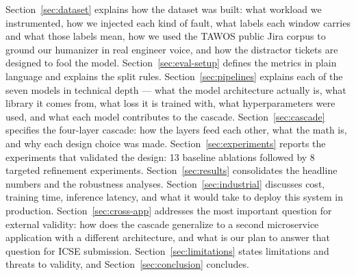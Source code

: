 Section~\ref{sec:dataset} explains how the dataset was built: what workload we instrumented, how we injected each kind of fault, what labels each window carries and what those labels mean, how we used the TAWOS public Jira corpus to ground our humanizer in real engineer voice, and how the distractor tickets are designed to fool the model. Section~\ref{sec:eval-setup} defines the metrics in plain language and explains the split rules. Section~\ref{sec:pipelines} explains each of the seven models in technical depth --- what the model architecture actually is, what library it comes from, what loss it is trained with, what hyperparameters were used, and what each model contributes to the cascade. Section~\ref{sec:cascade} specifies the four-layer cascade: how the layers feed each other, what the math is, and why each design choice was made. Section~\ref{sec:experiments} reports the experiments that validated the design: 13 baseline ablations followed by 8 targeted refinement experiments. Section~\ref{sec:results} consolidates the headline numbers and the robustness analyses. Section~\ref{sec:industrial} discusses cost, training time, inference latency, and what it would take to deploy this system in production. Section~\ref{sec:cross-app} addresses the most important question for external validity: how does the cascade generalize to a second microservice application with a different architecture, and what is our plan to answer that question for ICSE submission. Section~\ref{sec:limitations} states limitations and threats to validity, and Section~\ref{sec:conclusion} concludes.
